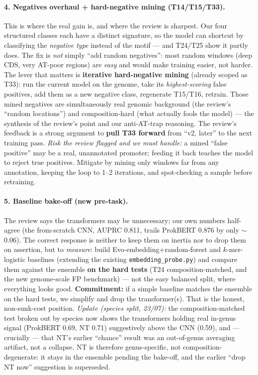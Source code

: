 \documentclass{article}
\begin{document}
\paragraph{4. Negatives overhaul + hard-negative mining (T14/T15/T33).}
This is where the real gain is, and where the review is sharpest. Our four structured classes each have a distinct signature, so the model can shortcut by classifying the \emph{negative type} instead of the motif --- and T24/T25 show it partly does. The fix is \emph{not} simply ``add random negatives'': most random windows (deep CDS, very AT-poor regions) are \emph{easy} and would make training easier, not harder. The lever that matters is \textbf{iterative hard-negative mining} (already scoped as T33): run the current model on the genome, take its \emph{highest-scoring} false positives, add them as a new negative class, regenerate T15/T16, retrain. Those mined negatives are simultaneously real genomic background (the review's ``random locations'') and composition-hard (what actually fools the model) --- the synthesis of the review's point and our anti-AT-trap reasoning. The review's feedback is a strong argument to \textbf{pull T33 forward} from ``v2, later'' to the next training pass. \emph{Risk the review flagged and we must handle:} a mined ``false positive'' may be a real, unannotated promoter; feeding it back teaches the model to reject true positives. Mitigate by mining only windows far from any annotation, keeping the loop to 1--2 iterations, and spot-checking a sample before retraining.

\paragraph{5. Baseline bake-off (new pre-task).}
The review says the transformers may be unnecessary; our own numbers half-agree (the from-scratch CNN, AUPRC 0.811, trails ProkBERT 0.876 by only $\sim$0.06). The correct response is neither to keep them on inertia nor to drop them on assertion, but to \emph{measure}: build Evo-embedding$+$random-forest and $k$-mer-logistic baselines (extending the existing \texttt{embedding\_probe.py}) and compare them against the ensemble \textbf{on the hard tests} (T24 composition-matched, and the new genome-scale FP benchmark) --- not the easy balanced split, where everything looks good. \textbf{Commitment:} if a simple baseline matches the ensemble on the hard tests, we simplify and drop the transformer(s). That is the honest, non-sunk-cost position. \emph{Update (species split, 23/07):} the composition-matched test broken out by species now shows the transformers holding real in-genus signal (ProkBERT 0.69, NT 0.71) suggestively above the CNN (0.59), and --- crucially --- that NT's earlier ``chance'' result was an out-of-genus averaging artifact, not a collapse. NT is therefore genus-specific, not composition-degenerate: it stays in the ensemble pending the bake-off, and the earlier ``drop NT now'' suggestion is superseded.
\end{document}
